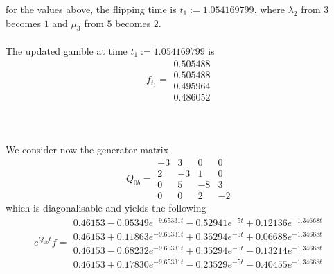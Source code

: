 \documentclass{article}
\begin{document}
for the values above, the flipping time is $t_{1}:= 1.054169799$, where $\lambda_{2}$ from $3$ becomes $1$ and $\mu_{3}$ from $5$ becomes $2$.\\\\
The updated gamble at time $t_{1}:= 1.054169799$ is
\begin{equation*}  
 f_{t_1}= 
 \begin{array}{|c|}
  0.505488\\
  0.505488\\
  0.495964\\
  0.486052  
 \end{array}
 \end{equation*}\\\\\\
We consider now the generator matrix 
\begin{equation*} 
 Q_{0b}= 
 \begin{array}{|rrrr|}
  -3 & 3 & 0 & 0 \\
  2 & -3 & 1 & 0 \\
  0 & 5 & -8 & 3 \\
  0 & 0 & 2 & -2 
 \end{array}
 \end{equation*}
which is diagonalisable and yields the following
\begin{equation*} 
 e^{Q_{0b}t}f= 
 \begin{array}{|r|}
  0.46153-0.05349e^{-9.65331t}- 0.52941e^{-5t}+ 0.12136e^{-1.34668t}\\
  0.46153+0.11863e^{-9.65331t}+ 0.35294e^{-5t}+ 0.06688e^{-1.34668t}\\
  0.46153-0.68232e^{-9.65331t}+ 0.35294e^{-5t}- 0.13214e^{-1.34668t}\\
  0.46153+0.17830e^{-9.65331t}- 0.23529e^{-5t}- 0.40455e^{-1.34668t}  
 \end{array}
 \end{equation*}
\end{document}
